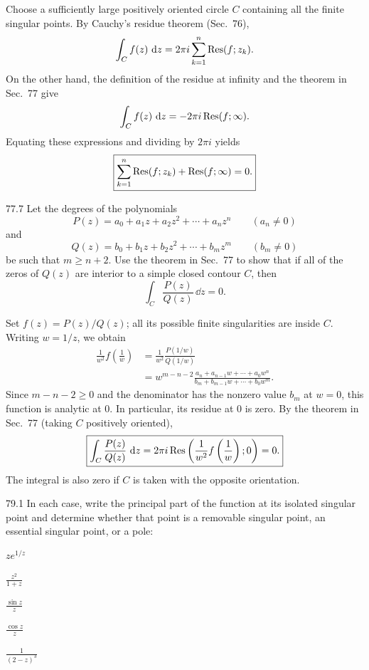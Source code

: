 \documentclass[11pt,oneside]{article}
\begin{document}
\begin{solution}
Choose a sufficiently large positively oriented circle $C$ containing all the finite singular points. By Cauchy's residue theorem (Sec.~76),
\[
    \int_C f(z)\,\mathop{}\!\mathrm{d} z=2\pi i\sum_{k=1}^{n}\operatorname{Res}(f; z_k).
\]
On the other hand, the definition of the residue at infinity and the theorem in Sec.~77 give
\[
    \int_C f(z)\,\mathop{}\!\mathrm{d} z=-2\pi i\operatorname{Res}(f; \infty).
\]
Equating these expressions and dividing by $2\pi i$ yields
\[
    \boxed{\sum_{k=1}^{n}\operatorname{Res}(f; z_k)+\operatorname{Res}(f; \infty)=0.}
\]
\end{solution}

\begin{exercise}{77.7}
Let the degrees of the polynomials
\[
    P(z)=a_0+a_1z+a_2z^2+\cdots+a_nz^n\qquad(a_n\ne0)
\]
and
\[
    Q(z)=b_0+b_1z+b_2z^2+\cdots+b_mz^m\qquad(b_m\ne0)
\]
be such that $m\ge n+2$. Use the theorem in Sec.~77 to show that if all of the zeros of $Q(z)$ are interior to a simple closed contour $C$, then
\[
    \int_C\frac{P(z)}{Q(z)}\,\dd z=0.
\]
\end{exercise}

\begin{solution}
Set $f(z)=P(z)/Q(z)$; all its possible finite singularities are inside $C$. Writing $w=1/z$, we obtain
\[
\begin{aligned}
    \frac1{w^2}f\left(\frac1w\right)
    &=\frac1{w^2}\frac{P(1/w)}{Q(1/w)}\\
    &=w^{m-n-2}
      \frac{a_n+a_{n-1}w+\cdots+a_0w^n}
           {b_m+b_{m-1}w+\cdots+b_0w^m}.
\end{aligned}
\]
Since $m-n-2\ge0$ and the denominator has the nonzero value $b_m$ at $w=0$, this function is analytic at $0$. In particular, its residue at $0$ is zero. By the theorem in Sec.~77 (taking $C$ positively oriented),
\[
    \boxed{\int_C\frac{P(z)}{Q(z)}\,\mathop{}\!\mathrm{d} z
      =2\pi i\operatorname{Res}\left(\frac1{w^2}f\left(\frac1w\right); 0\right)=0.}
\]
The integral is also zero if $C$ is taken with the opposite orientation.
\end{solution}

\begin{exercise}{79.1}
In each case, write the principal part of the function at its isolated singular point and determine whether that point is a removable singular point, an essential singular point, or a pole:
\begin{exercisesubparts}
    \item $\displaystyle ze^{1/z}$
    \item $\displaystyle\frac{z^2}{1+z}$
    \item $\displaystyle\frac{\sin z}{z}$
    \item $\displaystyle\frac{\cos z}{z}$
    \item $\displaystyle\frac1{(2-z)^3}$
\end{exercisesubparts}
\end{exercise}
\end{document}
